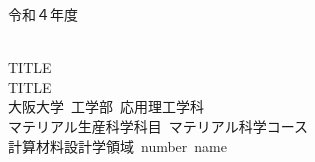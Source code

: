 \begin{titlepage}
\begin{spacing}{2.3}
{\large 令和４年度}\\
\hspace{4mm}{\large 卒業研究}\\
\begin{center}
\vspace{100truept}
{\LARGE TITLE}\\ %
{\LARGE TITLE}\\
\vspace{150truept}
{\LARGE 大阪大学\ 工学部\ 応用理工学科}\\ %
{\LARGE マテリアル生産科学科目\ マテリアル科学コース}\\ %
{\LARGE 計算材料設計学領域\ number\ name}\\ %
\end{center}

\end{spacing}
\end{titlepage}
